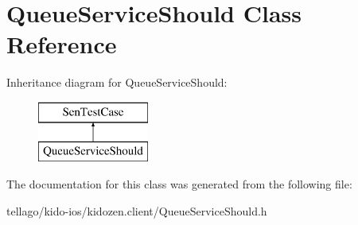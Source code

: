 \hypertarget{interface_queue_service_should}{\section{Queue\-Service\-Should Class Reference}
\label{interface_queue_service_should}
}
Inheritance diagram for Queue\-Service\-Should\-:\begin{figure}[H]
\begin{center}
\leavevmode
\includegraphics[height=2.000000cm]{interface_queue_service_should}
\end{center}
\end{figure}


The documentation for this class was generated from the following file\-:\begin{DoxyCompactItemize}
\item 
tellago/kido-\/ios/kidozen.\-client/Queue\-Service\-Should.\-h\end{DoxyCompactItemize}
